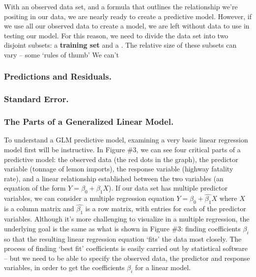 \documentclass[12pt]{article}
\begin{document}
	With an observed data set, and a formula that outlines the relationship we're positing in our data, we are nearly ready to create a
predictive model.  However, if we use all our observed data to create a model, we are left without data to use in testing our model.  For this
reason, we need to divide the data set into two disjoint subsets:  a \textbf{training set} and a .  The relative size of these
subsets can vary -- some `rules of thumb'    
We can't 


	\subsubsection{Predictions and Residuals.}
	
	\subsubsection{Standard Error.}


\subsubsection{The Parts of a Generalized Linear Model.}

To understand a GLM predictive model, examining a very basic linear regression model first will be instructive.  In Figure \#3, we can see four
critical parts of a predictive model:  the observed data (the red dots in the graph), the predictor variable (tonnage of lemon imports), the 
response variable (highway fatality rate), and a linear relationship established between the two variables (an equation of the form 
$Y = \beta_0 + \beta_1 X$).  If our data set has multiple predictor variables, we can consider a multiple regression equation 
$Y = \beta_0 + \hat{\beta_1} X$ where $X$ is a column matrix and $\hat{\beta_1}$ is a row matrix, with entries for each of the predictor variables.  
Although it's more challenging to visualize in a multiple regression, the underlying goal is the same as what is shown in Figure \#3: finding 
coefficients $\beta_i$ so that the resulting linear regression equation `fits' the data most closely.  The process of finding `best fit' 
coefficients is easily carried out by statistical software -- but we need to be able to specify the observed data, the predictor and response 
variables, in order to get the coefficients $\beta_i$ for a linear model.
\end{document}
